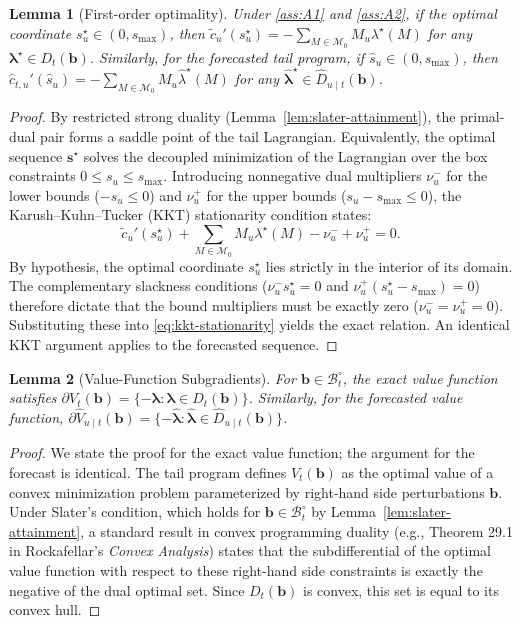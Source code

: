 \documentclass{uai2026} %
\newtheorem{lemma}{Lemma}
\newcommand{\1}{\mathbf{1}}
\newcommand{\mcal}{\mathcal{M}}
\newcommand{\subdiff}{\partial}
\newcommand{\bcal}{\mathcal{B}}
\begin{document}
\begin{lemma}[First-order optimality]
  \label{lem:interior-optimality}
  Under \ref{ass:A1} and \ref{ass:A2}, if the optimal coordinate $s_u^\star \in (0, s_{\max})$, then $\tilde{c}_u'(s_u^\star) = - \sum_{M \in \mcal_0} M_{u} \lambda^\star(M)$ for any $\boldsymbol{\lambda}^\star \in D_t(\mathbf{b})$.
  Similarly, for the forecasted tail program, if $\hat{s}_u \in (0, s_{\max})$, then $\hat{c}_{t,u}'(\hat{s}_u) = - \sum_{M \in \mcal_0} M_{u} \hat{\lambda}^\star(M)$ for any $\hat{\boldsymbol{\lambda}}^\star \in \hat{D}_{u \mid t}(\mathbf{b})$.
\end{lemma}
\begin{proof}
  By restricted strong duality (Lemma~\ref{lem:slater-attainment}), the primal-dual pair forms a saddle point of the tail Lagrangian.
  Equivalently, the optimal sequence $\mathbf{s}^\star$ solves the decoupled minimization of the Lagrangian over the box constraints $0 \le s_u \le s_{\max}$.
  Introducing nonnegative dual multipliers $\nu_u^-$ for the lower bounds ($-s_u \le 0$) and $\nu_u^+$ for the upper bounds ($s_u - s_{\max} \le 0$), the Karush--Kuhn--Tucker (KKT) stationarity condition states:
  \begin{equation}
    \label{eq:kkt-stationarity}
    \tilde{c}_u'(s_u^\star) + \sum_{M \in \mcal_0} M_{u} \lambda^\star(M) - \nu_u^- + \nu_u^+ = 0.
  \end{equation}
  By hypothesis, the optimal coordinate $s_u^\star$ lies strictly in the interior of its domain. The complementary slackness conditions ($\nu_u^- s_u^\star = 0$ and $\nu_u^+(s_u^\star - s_{\max}) = 0$) therefore dictate that the bound multipliers must be exactly zero ($\nu_u^- = \nu_u^+ = 0$). Substituting these into \eqref{eq:kkt-stationarity} yields the exact relation. An identical KKT argument applies to the forecasted sequence.
\end{proof}

\begin{lemma}[Value-Function Subgradients]
  \label{lem:dual-subgrad}
  For $\mathbf{b} \in \bcal_t^\circ$, the exact value function satisfies $\subdiff V_t(\mathbf{b}) = \{-\boldsymbol{\lambda} : \boldsymbol{\lambda} \in D_t(\mathbf{b})\}$.
  Similarly, for the forecasted value function, $\subdiff \hat{V}_{u\mid t}(\mathbf{b}) = \{-\hat{\boldsymbol{\lambda}} : \hat{\boldsymbol{\lambda}} \in \hat{D}_{u\mid t}(\mathbf{b})\}$.
\end{lemma}
\begin{proof}
  We state the proof for the exact value function; the argument for the forecast is identical. The tail program defines $V_t(\mathbf{b})$ as the optimal value of a convex minimization problem parameterized by right-hand side perturbations $\mathbf{b}$.
  Under Slater's condition, which holds for $\mathbf{b} \in \bcal_t^\circ$ by Lemma~\ref{lem:slater-attainment}, a standard result in convex programming duality (e.g., Theorem 29.1 in Rockafellar's \emph{Convex Analysis}) states that the subdifferential of the optimal value function with respect to these right-hand side constraints is exactly the negative of the dual optimal set.
  Since $D_t(\mathbf{b})$ is convex, this set is equal to its convex hull.
\end{proof}
\end{document}
